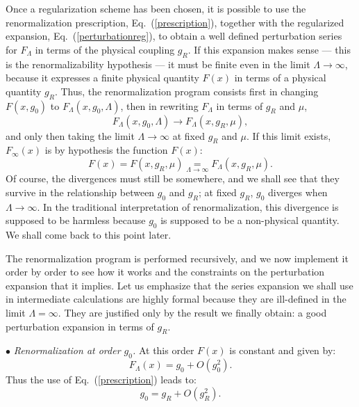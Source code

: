 \documentclass[floatfix,preprintnumbers,amsmath,amssymb,prb,12pt]{revtex4-1}
\begin{document}
Once a regularization scheme has been chosen, it is possible to use
the renormalization prescription, Eq.~(\ref{prescription}),
together with the regularized expansion,
Eq.~(\ref{perturbationreg}), to obtain a well defined perturbation
series for
$F_\Lambda$ in terms of the physical coupling $g_R$. If this
expansion makes sense --- this is the renormalizability hypothesis
--- it must be finite even in the limit $\Lambda\to \infty$, because
it expresses a finite physical quantity $F(x)$ in terms of a
physical quantity
$g_R$. Thus, the renormalization program consists first in changing 
$F(x,g_0)$ to $F_\Lambda(x,g_0,\Lambda)$, then in rewriting
$F_\Lambda$ in terms of $g_R$ and $\mu$,
\begin{equation}
F_\Lambda(x,g_0,\Lambda) \to F_\Lambda(x,g_R,\mu),
\end{equation}
and only then taking the limit $\Lambda\to\infty$ at fixed $g_R$
and $\mu$. If this limit exists, $F_{\infty}(x)$ is by
hypothesis the function
$F(x)$:
\begin{equation}
F(x)=F(x,g_R,\mu)\underset{\Lambda\to\infty}{=}F_\Lambda(x,g_R,\mu).
\end{equation} 
Of course, the divergences must still be somewhere, and we
shall see that they survive in the relationship between $g_0$ and
$g_R$; at fixed $g_R$, $g_0$ diverges when $\Lambda\to\infty$. In
the traditional interpretation of renormalization, this divergence
is supposed to be harmless because $g_0$ is supposed to be a
non-physical quantity. We shall come back to this point later. 

The renormalization program is performed recursively, and we
now implement it order by order to see how it works and the
constraints on the perturbation expansion that it implies. Let us
emphasize that the series expansion we shall use in intermediate
calculations are highly formal because they are ill-defined in the
limit $\Lambda=\infty$. They are justified only by the result we
finally obtain: a good perturbation expansion in terms of
$g_R$.\cite{foot6}

$\bullet$ {\it Renormalization at order $g_0$.} At this order $F(x)$ is constant and given by:
\begin{equation}
F_\Lambda(x)= g_0 + O(g_0^2).
\end{equation} 
Thus the use of Eq.~(\ref{prescription}) leads to:
\begin{equation}
g_0=g_R+O(g_R^2).
\end{equation}
\end{document}
